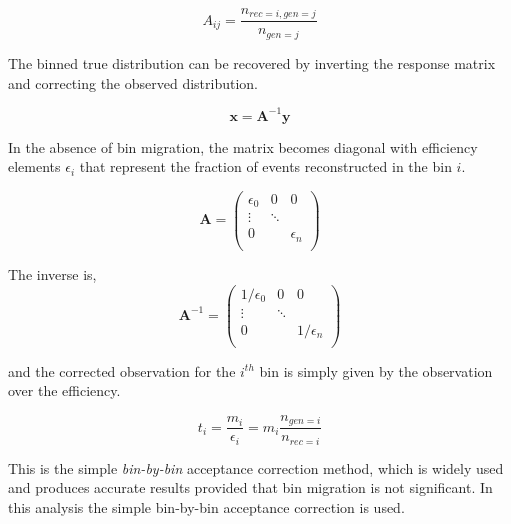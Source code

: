 \begin{equation}
  A_{ij} = \frac{n_{rec=i, gen=j}}{n_{gen=j}}
\end{equation}

The binned true distribution can be recovered by inverting the response matrix and correcting the observed distribution.

\begin{equation}
  \mathbf{x} = \mathbf{A}^{-1} \mathbf{y} 
\end{equation}

In the absence of bin migration, the matrix becomes diagonal with efficiency elements $\epsilon_i$ that represent the fraction of events reconstructed in the bin $i$.

\begin{equation}
  \mathbf{A} = \begin{pmatrix}
    \epsilon_0 & 0 & 0\\
    \vdots & \ddots \\
    0 &  & \epsilon_n \\
  \end{pmatrix}
\end{equation}


The inverse is, 
\begin{equation}
  \mathbf{A}^{-1} = \begin{pmatrix}
    1/\epsilon_0 & 0 & 0\\
    \vdots & \ddots \\
    0 &  & 1/\epsilon_n \\
  \end{pmatrix}
\end{equation}

and the corrected observation for the $i^{th}$ bin is simply given by the observation over the efficiency.

\begin{equation}
  t_i = \frac{m_i}{\epsilon_i} = m_i \frac{n_{gen=i}}{n_{rec=i}}
\end{equation}

This is the simple \textit{bin-by-bin} acceptance correction method, which is widely used and produces accurate results provided that bin migration is not significant.  In this analysis the simple bin-by-bin acceptance correction is used.  

